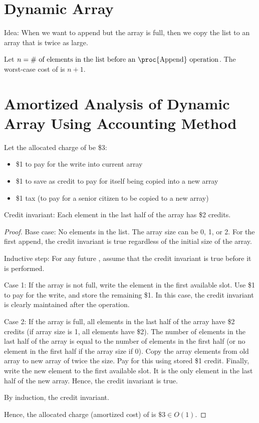 \section{Dynamic Array}

Idea: When we want to append but the array is full, then we copy the list to an array that is twice as large.

Let $n = \text{\# of elements in the list before an \proc{Append} operation}$. The worst-case cost of  is $n+1$.

\section{Amortized Analysis of Dynamic Array Using Accounting Method}
Let the allocated charge of  be \$3:
\begin{itemize}
    \item \$1 to pay for the write into current array
    \item \$1 to save as credit to pay for itself being copied into a new array
    \item \$1 tax (to pay for a senior citizen to be copied to a new array)
\end{itemize}

Credit invariant: Each element in the last half of the array has \$2 credits.

\begin{proof}
    Base case: No elements in the list. The array size can be 0, 1, or 2. For the first append, the credit invariant is true regardless of the initial size of the array.

    Inductive step: For any future , assume that the credit invariant is true before it is performed.

    Case 1: If the array is not full, write the element in the first available slot. Use \$1 to pay for the write, and store the remaining \$1. In this case, the credit invariant is clearly maintained after the  operation.

    Case 2: If the array is full, all elements in the last half of the array have \$2 credits (if array size is 1, all elements have \$2). The number of elements in the last half of the array is equal to the number of elements in the first half (or no element in the first half if the array size if 0). Copy the array elements from old array to new array of twice the size. Pay for this using stored \$1 credit. Finally, write the new element to the first available slot. It is the only element in the last half of the new array. Hence, the credit invariant is true.

    By induction, the credit invariant.

    Hence, the allocated charge (amortized cost) of  is $\$3 \in O(1)$.
\end{proof}

